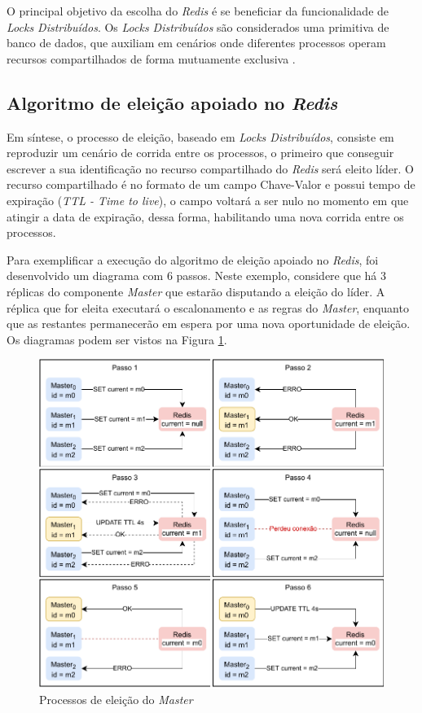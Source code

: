 O principal objetivo da escolha do \textit{Redis} é se beneficiar da funcionalidade de \textit{Locks Distribuídos}. Os \textit{Locks Distribuídos} são considerados uma primitiva de banco de dados, que auxiliam em cenários onde diferentes processos operam recursos compartilhados de forma mutuamente exclusiva \cite{redisDistributedLocks}.

\subsection{Algoritmo de eleição apoiado no \textit{Redis}}

Em síntese, o processo de eleição, baseado em \textit{Locks Distribuídos}, consiste em reproduzir um cenário de corrida entre os processos, o primeiro que conseguir escrever a sua identificação no recurso compartilhado do \textit{Redis} será eleito líder. O recurso compartilhado é no formato de um campo Chave-Valor e possui tempo de expiração (\textit{TTL - Time to live}), o campo voltará a ser nulo no momento em que atingir a data de expiração, dessa forma, habilitando uma nova corrida entre os processos.

Para exemplificar a execução do algoritmo de eleição apoiado no \textit{Redis}, foi desenvolvido um diagrama com 6 passos. Neste exemplo, considere que há 3 réplicas do componente \textit{Master} que estarão disputando a eleição do líder. A réplica que for eleita executará o escalonamento e as regras do \textit{Master}, enquanto que as restantes permanecerão em espera por uma nova oportunidade de eleição. Os diagramas podem ser vistos na Figura \ref{fig:eleicao-todos-os-passos}.

\begin{figure}[h!]
	\caption{\label{fig:eleicao-todos-os-passos}Processos de eleição do \textit{Master}}
	\centering
	\includegraphics[width=\linewidth]{assets/eleicao-todos-os-passos.pdf}
\end{figure}

